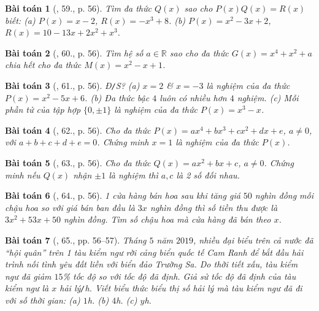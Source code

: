 \documentclass{article}
\newtheorem{baitoan}{Bài toán}
\begin{document}
\begin{baitoan}[\cite{SBT_Toan_7_Canh_Dieu_tap_2}, 59., p. 56]
	Tìm đa thức $Q(x)$ sao cho $P(x)Q(x) = R(x)$ biết: (a) $P(x) = x - 2$, $R(x) = -x^3 + 8$. (b) $P(x) = x^2 - 3x + 2$, $R(x) = 10 - 13x + 2x^2 + x^3$.
\end{baitoan}

\begin{baitoan}[\cite{SBT_Toan_7_Canh_Dieu_tap_2}, 60., p. 56]
	Tìm hệ số $a\in\mathbb{R}$ sao cho đa thức $G(x) = x^4 + x^2 + a$ chia hết cho đa thức $M(x) = x^2 - x + 1$.
\end{baitoan}

\begin{baitoan}[\cite{SBT_Toan_7_Canh_Dieu_tap_2}, 61., p. 56]
	\emph{Đ\texttt{/}S?} (a) $x = 2$ \& $x = -3$ là nghiệm của đa thức $P(x) = x^2 - 5x + 6$. (b) Đa thức bậc $4$ luôn có nhiều hơn $4$ nghiệm. (c) Mỗi phần tử của tập hợp $\{0,\pm1\}$ là nghiệm của đa thức $P(x) = x^3 - x$.
\end{baitoan}

\begin{baitoan}[\cite{SBT_Toan_7_Canh_Dieu_tap_2}, 62., p. 56]
	Cho đa thức $P(x) = ax^4 + bx^3 + cx^2 + dx + e$, $a\ne0$, với $a + b + c + d + e = 0$. Chứng minh $x = 1$ là nghiệm của đa thức $P(x)$.
\end{baitoan}

\begin{baitoan}[\cite{SBT_Toan_7_Canh_Dieu_tap_2}, 63., p. 56]
	Cho đa thức $Q(x) = ax^2 + bx + c$, $a\ne0$. Chứng minh nếu $Q(x)$ nhận $\pm1$ là nghiệm thì $a,c$ là 2 số đối nhau.
\end{baitoan}

\begin{baitoan}[\cite{SBT_Toan_7_Canh_Dieu_tap_2}, 64., p. 56]
	1 cửa hàng bán hoa sau khi tăng giá $50$ nghìn đồng mỗi chậu hoa so với giá bán ban đầu là $3x$ nghìn đồng thì số tiền thu được là $3x^2 + 53x + 50$ nghìn đồng. Tìm số chậu hoa mà cửa hàng đã bán theo $x$.
\end{baitoan}

\begin{baitoan}[\cite{SBT_Toan_7_Canh_Dieu_tap_2}, 65., pp. 56--57]
	Tháng $5$ năm $2019$, nhiều đại biểu trên cả nước đã ``hội quân'' trên 1 tàu kiểm ngư rời cảng biển quốc tế Cam Ranh để bắt đầu hải  trình nối tình yêu đất liền với biển đảo Trường Sa. Do thời tiết xấu, tàu kiểm ngư đã giảm $15$\% tốc độ so với tốc độ đã định. Giả sử tốc độ đã định của tàu kiểm ngư là $x$ \emph{hải lý\texttt{/}h}. Viết biểu thức biểu thị số hải lý mà tàu kiểm ngư đã đi với số thời gian: (a) $1$\emph{h}. (b) $4$\emph{h}. (c) $y$\emph{h}.
\end{baitoan}
\end{document}
